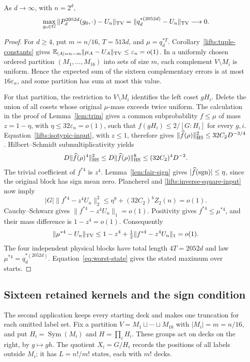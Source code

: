 \begin{proposition}\label{lifts:random-four-blocks}
As $d\to\infty$, with $n=2^d$,
\[
 \max_{g_0\in G}\|P_d^{2052d}(g_0,\cdot)-U_n\|_{\mathrm{TV}}
 =\|q_d^{*(2052d)}-U_n\|_{\mathrm{TV}}\longrightarrow0.
\]
\end{proposition}
\begin{proof}
For $d\ge4$, put $m=n/16$, $T=513d$, and $\mu=q_d^{*T}$.
Corollary~\ref{lifts:tuple-constants} gives
$\mathbb E_{|A|=n-m}\|\mu_A-U_A\|_{\mathrm{TV}}\le\varepsilon_n=o(1)$.
In a uniformly chosen ordered partition $(M_1,\ldots,M_{16})$
into sets of size $m$, each complement $V\setminus M_i$ is uniform.
Hence the expected sum of the sixteen complementary errors is at most
$16\varepsilon_n$, and some partition has sum at most this value.

For that partition, the restriction to $V\setminus M_i$ identifies
the left coset $gH_i$. Delete the union of all cosets whose original
$\mu$-mass exceeds twice uniform. The calculation in the proof of
Lemma~\ref{lem:trim} gives a common subprobability $f\le\mu$ of mass
$z=1-\eta$, with $\eta\le32\varepsilon_n=o(1)$, such that
$f(gH_i)\le2/[G:H_i]$ for every $g,i$.
Equation~\eqref{lifts:isotypic-input}, with $z\le1$, therefore gives
$\|\widehat f(\rho)\|_{\mathrm{HS}}^2\le32C_2D^{-3/4}$.
Hilbert--Schmidt submultiplicativity yields
\[
 D\|\widehat f(\rho)^4\|_{\mathrm{HS}}^2
 \le D\|\widehat f(\rho)\|_{\mathrm{HS}}^8
 \le(32C_2)^4D^{-2}.
\]
The trivial coefficient of $f^{*4}$ is $z^4$.
Lemma~\ref{lem:fair-sign} gives
$|\widehat f(\operatorname{sgn})|\le\eta$, since the original block has sign mean zero.
Plancherel and \eqref{lifts:inverse-square-input} now imply
\[
 |G|\|f^{*4}-z^4U_n\|_2^2
 \le \eta^8+(32C_2)^4Z_2(n)=o(1).
\]
Cauchy--Schwarz gives $\|f^{*4}-z^4U_n\|_1=o(1)$.
Positivity gives $f^{*4}\le\mu^{*4}$, and their mass difference is
$1-z^4=o(1)$. Consequently
\[
 \|\mu^{*4}-U_n\|_{\mathrm{TV}}
 \le 1-z^4+\tfrac12\|f^{*4}-z^4U_n\|_1=o(1).
\]
The four independent physical blocks have total length
$4T=2052d$ and law $\mu^{*4}=q_d^{*(2052d)}$.
Equation~\eqref{eq:worst-state} gives the stated maximum over starts.
\end{proof}

\subsection{Sixteen retained kernels and the sign condition}

The second application keeps every starting deck and makes one
truncation for each omitted label set. Fix a partition
$V=M_1\sqcup\cdots\sqcup M_{16}$ with $|M_i|=m=n/16$, and put
$H_i=\operatorname{Sym}(M_i)$ and $H=\prod_iH_i$.
These groups act on decks on the right, by $g\mapsto gh$.
The quotient $X_i=G/H_i$ records the positions of all labels outside
$M_i$; it has $L=n!/m!$ states, each with $m!$ decks.

